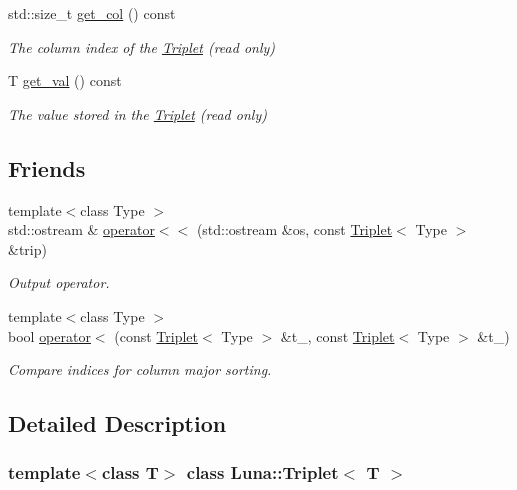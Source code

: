 \begin{DoxyCompactItemize}
std\+::size\+\_\+t \hyperlink{classLuna_1_1Triplet_a7d5bdd021a6191f49e349795a304db60}{get\+\_\+col} () const
\begin{DoxyCompactList}\small\item\em The column index of the \hyperlink{classLuna_1_1Triplet}{Triplet} (read only) \end{DoxyCompactList}\item 
T \hyperlink{classLuna_1_1Triplet_ab0b45980f9930e0cade9c2ad5f254c87}{get\+\_\+val} () const
\begin{DoxyCompactList}\small\item\em The value stored in the \hyperlink{classLuna_1_1Triplet}{Triplet} (read only) \end{DoxyCompactList}\end{DoxyCompactItemize}
\subsection*{Friends}
\begin{DoxyCompactItemize}
\item 
{\footnotesize template$<$class Type $>$ }\\std\+::ostream \& \hyperlink{classLuna_1_1Triplet_ad729c9b68955dcc5154d6bbd54a37a38}{operator$<$$<$} (std\+::ostream \&os, const \hyperlink{classLuna_1_1Triplet}{Triplet}$<$ Type $>$ \&trip)
\begin{DoxyCompactList}\small\item\em Output operator. \end{DoxyCompactList}\item 
{\footnotesize template$<$class Type $>$ }\\bool \hyperlink{classLuna_1_1Triplet_a2742a8732adbcb3f14119b23efae19e6}{operator$<$} (const \hyperlink{classLuna_1_1Triplet}{Triplet}$<$ Type $>$ \&t\+\_, const \hyperlink{classLuna_1_1Triplet}{Triplet}$<$ Type $>$ \&t\+\_)
\begin{DoxyCompactList}\small\item\em Compare indices for column major sorting. \end{DoxyCompactList}\end{DoxyCompactItemize}


\subsection{Detailed Description}
\subsubsection*{template$<$class T$>$\newline
class Luna\+::\+Triplet$<$ T $>$}

